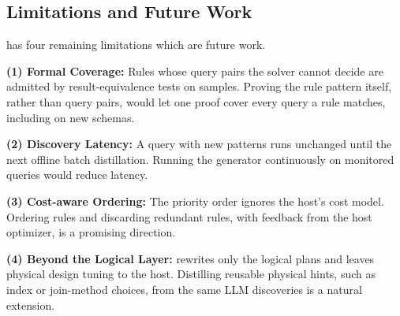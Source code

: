 \vspace{-0.35cm}
\subsection{Limitations and Future Work}
\label{sec:limitations}

{\sys} has four remaining limitations which are future work.

\textbf{(1) Formal Coverage:}
Rules whose query pairs the solver cannot decide are admitted by result-equivalence tests on samples.
Proving the rule pattern itself, rather than query pairs, would let one proof cover every query a rule matches, including on new schemas.

\textbf{(2) Discovery Latency:}
A query with new patterns runs unchanged until the next offline batch distillation.
Running the generator continuously on monitored queries would reduce latency.

\textbf{(3) Cost-aware Ordering:}
The priority order ignores the host's cost model.
Ordering rules and discarding redundant rules, with feedback from the host optimizer, is a promising direction.

\textbf{(4) Beyond the Logical Layer:}
{\sys} rewrites only the logical plans and leaves physical design tuning to the host.
Distilling reusable physical hints, such as index or join-method choices, from the same LLM discoveries is a natural extension.
